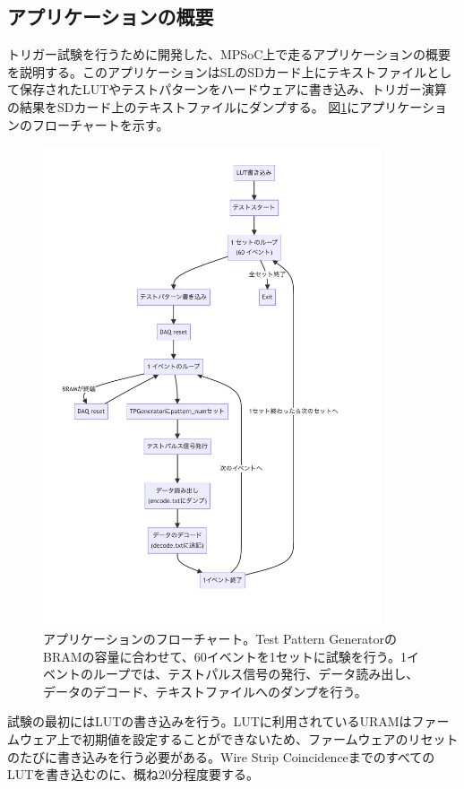 \subsection*{アプリケーションの概要}
トリガー試験を行うために開発した、MPSoC上で走るアプリケーションの概要を説明する。このアプリケーションはSLのSDカード上にテキストファイルとして保存されたLUTやテストパターンをハードウェアに書き込み、トリガー演算の結果をSDカード上のテキストファイルにダンプする。
図\ref{Flowchart}にアプリケーションのフローチャートを示す。

\begin{figure} 
\centering
\includegraphics[width=10cm]{fig/Test/Flowchart.pdf}
\caption[アプケーションのフローチャート]{アプリケーションのフローチャート。Test Pattern GeneratorのBRAMの容量に合わせて、60イベントを1セットに試験を行う。1イベントのループでは、テストパルス信号の発行、データ読み出し、データのデコード、テキストファイルへのダンプを行う。}
\label{Flowchart}
\end{figure}

試験の最初にはLUTの書き込みを行う。LUTに利用されているURAMはファームウェア上で初期値を設定することができないため、ファームウェアのリセットのたびに書き込みを行う必要がある。Wire Strip CoincidenceまでのすべてのLUTを書き込むのに、概ね20分程度要する。

